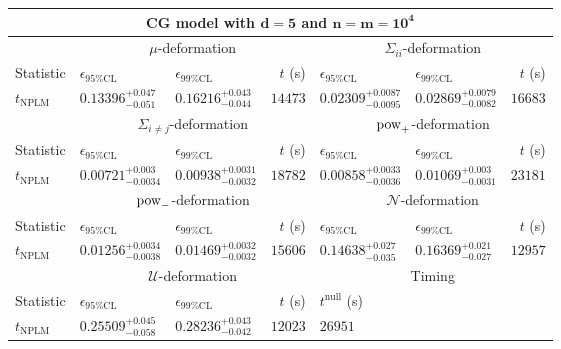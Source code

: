 \begin{tabular}{l|llr|llr}
	\toprule
	\multicolumn{7}{c}{{\bf CG model with $\mathbf{d=5}$ and $\mathbf{n=m=10^{4}}$}} \\
	\toprule
	\multicolumn{1}{c}{} & \multicolumn{3}{c}{$\mu$-deformation} & \multicolumn{3}{c}{$\Sigma_{ii}$-deformation} \\
	Statistic & $\epsilon_{95\%\mathrm{CL}}$ & $\epsilon_{99\%\mathrm{CL}}$ & $t$ (s) & $\epsilon_{95\%\mathrm{CL}}$ & $\epsilon_{99\%\mathrm{CL}}$ & $t$ (s) \\
	\midrule
	$t_{\mathrm{NPLM}}$ & $0.13396_{-0.051}^{+0.047}$ & $0.16216_{-0.044}^{+0.043}$ & $14473$ & $0.02309_{-0.0095}^{+0.0087}$ & $0.02869_{-0.0082}^{+0.0079}$ & $16683$ \\
	\toprule
	\multicolumn{1}{c}{} & \multicolumn{3}{c}{$\Sigma_{i\neq j}$-deformation} & \multicolumn{3}{c}{$\rm{pow}_{+}$-deformation} \\
	Statistic & $\epsilon_{95\%\mathrm{CL}}$ & $\epsilon_{99\%\mathrm{CL}}$ & $t$ (s) & $\epsilon_{95\%\mathrm{CL}}$ & $\epsilon_{99\%\mathrm{CL}}$ & $t$ (s) \\
	\midrule
	$t_{\mathrm{NPLM}}$ & $0.00721_{-0.0034}^{+0.003}$ & $0.00938_{-0.0032}^{+0.0031}$ & $18782$ & $0.00858_{-0.0036}^{+0.0033}$ & $0.01069_{-0.0031}^{+0.003}$ & $23181$ \\
	\toprule
	\multicolumn{1}{c}{} & \multicolumn{3}{c}{$\rm{pow}_{-}$-deformation} & \multicolumn{3}{c}{$\mathcal{N}$-deformation} \\
	Statistic & $\epsilon_{95\%\mathrm{CL}}$ & $\epsilon_{99\%\mathrm{CL}}$ & $t$ (s) & $\epsilon_{95\%\mathrm{CL}}$ & $\epsilon_{99\%\mathrm{CL}}$ & $t$ (s) \\
	\midrule
	$t_{\mathrm{NPLM}}$ & $0.01256_{-0.0038}^{+0.0034}$ & $0.01469_{-0.0032}^{+0.0032}$ & $15606$ & $0.14638_{-0.035}^{+0.027}$ & $0.16369_{-0.027}^{+0.021}$ & $12957$ \\
	\toprule
	\multicolumn{1}{c}{} & \multicolumn{3}{c}{$\mathcal{U}$-deformation} & \multicolumn{3}{c}{Timing} \\
	Statistic & $\epsilon_{95\%\mathrm{CL}}$ & $\epsilon_{99\%\mathrm{CL}}$ & $t$ (s) & $t^{\mathrm{null}}$ (s) \\
	\midrule
	$t_{\mathrm{NPLM}}$ & $0.25509_{-0.058}^{+0.045}$ & $0.28236_{-0.042}^{+0.043}$ & $12023$ & $26951$ \\
	\bottomrule
\end{tabular}